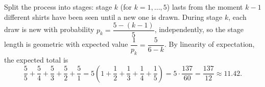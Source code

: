 Split the process into stages: stage $k$ (for $k=1,\dots,5$) lasts from the moment $k-1$ different shirts have been seen until a new one is drawn. During stage $k$, each draw is new with probability $p_k=\dfrac{5-(k-1)}{5}$, independently, so the stage length is geometric with expected value $\dfrac{1}{p_k}=\dfrac{5}{6-k}$. By linearity of expectation, the expected total is
\[\dfrac55+\dfrac54+\dfrac53+\dfrac52+\dfrac51=5\left(1+\dfrac12+\dfrac13+\dfrac14+\dfrac15\right)=5\cdot\dfrac{137}{60}=\boxed{\dfrac{137}{12}}\approx11.42.\]

